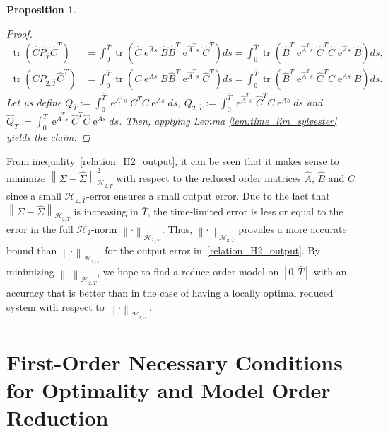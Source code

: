 \documentclass[a4paper,11pt, twoside]{article}
\newcommand{\expn}{\operatorname{e}}
\newcommand{\trace}{\operatorname{tr}}
\newtheorem{prop}[defn]{Proposition} %
\begin{document}
\begin{prop}
\begin{proof}
\begin{align*}
\trace(\hat C \hat P_{\bar T} \hat C^T)&=\int_0^{\bar T} \trace(\hat C \expn^{\hat As}\hat B\hat B^T\expn^{\hat A^Ts} \hat C^T) ds=\int_0^{\bar T} 
\trace(\hat B^T\expn^{\hat A^Ts} \hat C^T \hat C \expn^{\hat As}\hat B) ds,\\ 
\trace(C P_{2, \bar T} \hat C^T)&=\int_0^{\bar T}  \trace(C\expn^{As}B\hat B^T \expn^{\hat A^Ts} \hat C^T)ds=\int_0^{\bar T}  \trace(\hat 
B^T\expn^{\hat A^Ts}\hat C^T C\expn^{As}B)ds.                                          
                                                             \end{align*}
Let us define $Q_{\bar T}:=\int_0^{\bar T}  \expn^{A^Ts}C^TC \expn^{As}ds$, $Q_{2, \bar T}:=\int_0^{\bar T}  \expn^{\hat A^Ts}\hat C^TC 
\expn^{As}ds$ and $\hat Q_{\bar T}:=\int_0^{\bar T} \expn^{\hat A^Ts} \hat C^T \hat C \expn^{\hat As} ds$. Then, applying Lemma 
\ref{lem:time_lim_sylvester} yields the claim.
\end{proof}
\end{prop}
From inequality~\eqref{relation_H2_output}, it can be seen that it makes sense to minimize $\left\|\Sigma-\hat\Sigma\right\|^2_{\mathcal H_{2, \bar 
T}}$ with respect to the reduced order matrices $\hat A$, $\hat B$ and $\hat C$ since a small $\mathcal H_{2, \bar T}$-error ensures a small output 
error. Due to the fact that $\left\|\Sigma-\hat\Sigma\right\|_{\mathcal H_{2, \bar T}}$ is increasing in $\bar T$, the time-limited 
error is less or equal to the error in the full $\mathcal H_2$-norm $\left\|\cdot\right\|_{\mathcal H_{2, \infty}}$. Thus, 
$\left\|\cdot\right\|_{\mathcal H_{2, \bar T}}$ provides a more accurate bound than $\left\|\cdot\right\|_{\mathcal H_{2, \infty}}$ for the output 
error in~\eqref{relation_H2_output}. By minimizing $\left\|\cdot\right\|_{\mathcal H_{2, \bar T}}$, we hope to find a reduce order 
model on $[0, \bar T]$ with an accuracy that is better than in the case of having a locally optimal reduced system with respect to 
$\left\|\cdot\right\|_{\mathcal H_{2, \infty}}$. 

\section{First-Order Necessary Conditions for Optimality and Model Order Reduction}\label{sec:optimality_condtions}
\end{document}
